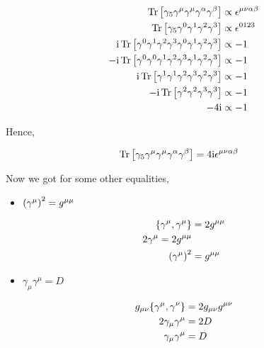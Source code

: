 \begin{align}
    \Tr\qty[\gamma_5\gamma^\mu\gamma^\mu\gamma^\alpha\gamma^\beta]&\propto\epsilon^{\mu\nu\alpha\beta}\nonumber\\
    \Tr\qty[\gamma_5\gamma^0\gamma^1\gamma^2\gamma^3]&\propto\epsilon^{0123}\nonumber\\
    \textnormal{i}\Tr\qty[\gamma^0\gamma^1\gamma^2\gamma^3\gamma^0\gamma^1\gamma^2\gamma^3]&\propto-1\nonumber\\
    -\textnormal{i}\Tr\qty[\gamma^0\gamma^0\gamma^1\gamma^2\gamma^3\gamma^1\gamma^2\gamma^3]&\propto-1\nonumber\\
    \textnormal{i}\Tr\qty[\gamma^1\gamma^1\gamma^2\gamma^3\gamma^2\gamma^3]&\propto-1\nonumber\\
    -\textnormal{i}\Tr\qty[\gamma^2\gamma^2\gamma^3\gamma^3]&\propto-1\nonumber\\
    -4\textnormal{i}&\propto-1\nonumber\\
\end{align}

Hence,

\begin{align}
    \Tr\qty[\gamma_5\gamma^\mu\gamma^\mu\gamma^\alpha\gamma^\beta]&=4\textnormal{i}\epsilon^{\mu\nu\alpha\beta}\nonumber
\end{align}

Now we got for some other equalities,

\begin{itemize}
    \item $\qty(\gamma^\mu)^2=g^{\mu\mu}$
\end{itemize}

\begin{align}
    \acomm{\gamma^\mu}{\gamma^\mu}&=2g^{\mu\mu}\nonumber\\
    2\gamma^\mu=2g^{\mu\mu}\nonumber\\
    \qty(\gamma^\mu)^2&=g^{\mu\mu}\nonumber
\end{align} 

\begin{itemize}
    \item $\gamma_\mu\gamma^\mu=D$
\end{itemize}

\begin{align}
    g_{\mu\nu}\acomm{\gamma^\mu}{\gamma^\nu}&=2g_{\mu\nu}g^{\mu\nu}\nonumber\\
    2\gamma_\mu\gamma^\mu&=2D\nonumber\\
    \gamma_\mu\gamma^\mu&=D\nonumber
\end{align}


